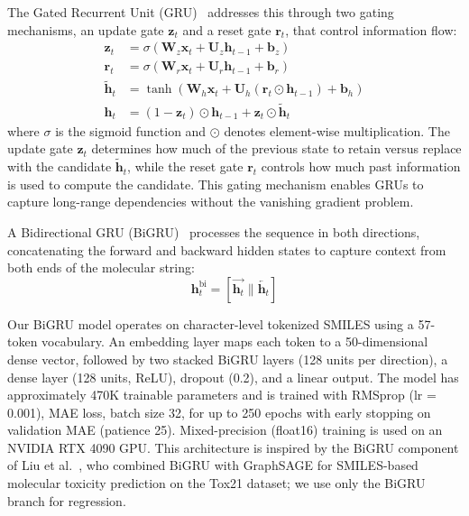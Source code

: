 \documentclass[journal=jcisd8,manuscript=article]{achemso}
\newcommand{\vect}[1]{\mathbf{#1}}
\newcommand{\matr}[1]{\mathbf{#1}}
\begin{document}
The Gated Recurrent Unit (GRU)~\cite{cho2014learning} addresses this through two gating mechanisms, an update gate $\vect{z}_t$ and a reset gate $\vect{r}_t$, that control information flow:
\begin{align}
    \vect{z}_t &= \sigma(\matr{W}_z \vect{x}_t + \matr{U}_z \vect{h}_{t-1} + \vect{b}_z) \label{eq:gru_update} \\
    \vect{r}_t &= \sigma(\matr{W}_r \vect{x}_t + \matr{U}_r \vect{h}_{t-1} + \vect{b}_r) \label{eq:gru_reset} \\
    \tilde{\vect{h}}_t &= \tanh(\matr{W}_h \vect{x}_t + \matr{U}_h (\vect{r}_t \odot \vect{h}_{t-1}) + \vect{b}_h) \label{eq:gru_candidate} \\
    \vect{h}_t &= (1 - \vect{z}_t) \odot \vect{h}_{t-1} + \vect{z}_t \odot \tilde{\vect{h}}_t \label{eq:gru_output}
\end{align}
where $\sigma$ is the sigmoid function and $\odot$ denotes element-wise multiplication.
The update gate $\vect{z}_t$ determines how much of the previous state to retain versus replace with the candidate $\tilde{\vect{h}}_t$, while the reset gate $\vect{r}_t$ controls how much past information is used to compute the candidate.
This gating mechanism enables GRUs to capture long-range dependencies without the vanishing gradient problem.

A Bidirectional GRU (BiGRU)~\cite{schuster1997bidirectional} processes the sequence in both directions, concatenating the forward and backward hidden states to capture context from both ends of the molecular string:
\begin{equation}
    \vect{h}_t^{\text{bi}} = [\overrightarrow{\vect{h}_t} \| \overleftarrow{\vect{h}_t}]
\end{equation}

Our BiGRU model operates on character-level tokenized SMILES using a 57-token vocabulary.
An embedding layer maps each token to a 50-dimensional dense vector, followed by two stacked BiGRU layers (128 units per direction), a dense layer (128 units, ReLU), dropout (0.2), and a linear output.
The model has approximately 470K trainable parameters and is trained with RMSprop (lr = 0.001), MAE loss, batch size 32, for up to 250 epochs with early stopping on validation MAE (patience 25).
Mixed-precision (float16) training is used on an NVIDIA RTX 4090 GPU.
This architecture is inspired by the BiGRU component of Liu et al.~\cite{liuPredictionMolecularToxicity2023}, who combined BiGRU with GraphSAGE for SMILES-based molecular toxicity prediction on the Tox21 dataset; we use only the BiGRU branch for regression.
\end{document}

